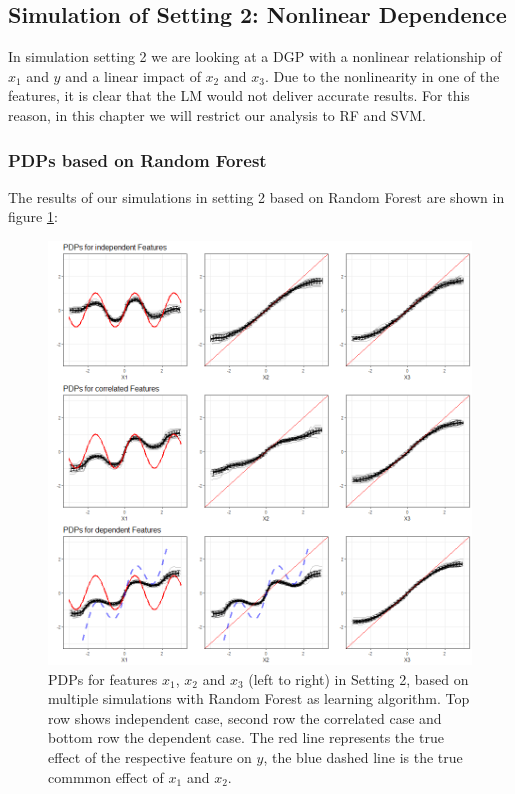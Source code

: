 \documentclass[]{krantz}
\begin{document}
\subsection{Simulation of Setting 2: Nonlinear
Dependence}\label{simulation-of-setting-2-nonlinear-dependence}

In simulation setting 2 we are looking at a DGP with a nonlinear
relationship of \(x_1\) and \(y\) and a linear impact of \(x_2\) and
\(x_3\). Due to the nonlinearity in one of the features, it is clear
that the LM would not deliver accurate results. For this reason, in this
chapter we will restrict our analysis to RF and SVM.

\subsubsection{PDPs based on Random
Forest}\label{pdps-based-on-random-forest-1}

The results of our simulations in setting 2 based on Random Forest are
shown in figure \ref{fig:Figure17}:

\begin{figure}

\includegraphics[width=1\linewidth]{images/VK_PDP_17_Set2_RF} \hfill{}

\caption{PDPs for features $x_1$, $x_2$ and $x_3$ (left to right) in Setting 2, based on multiple simulations with Random Forest as learning algorithm. Top row shows independent case, second row the correlated case and bottom row the dependent case. The red line represents the true effect of the respective feature on $y$, the blue dashed line is the true commmon effect of $x_1$ and $x_2$.}\label{fig:Figure17}
\end{figure}
\end{document}
